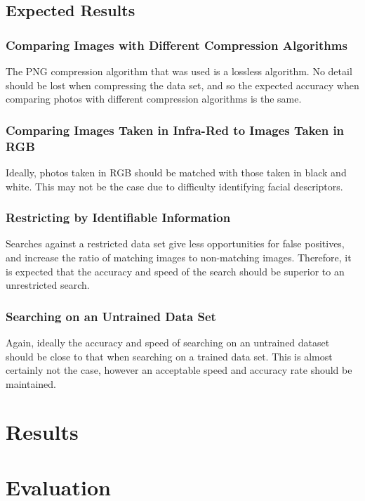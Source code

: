 \documentclass[12pt]{article}
\begin{document}
\subsection{Expected Results}
\subsubsection{Comparing Images with Different Compression Algorithms}
The PNG compression algorithm that was used is a lossless algorithm. No detail should be lost when compressing the data set, and so the expected accuracy when comparing photos with different compression algorithms is the same.

\subsubsection{Comparing Images Taken in Infra-Red to Images Taken in RGB}
Ideally, photos taken in RGB should be matched with those taken in black and white. This may not be the case due to difficulty identifying facial descriptors.

\subsubsection{Restricting by Identifiable Information}
Searches against a restricted data set give less opportunities for false positives, and increase the ratio of matching images to non-matching images. Therefore, it is expected that the accuracy and speed of the search should be superior to an unrestricted search.

\subsubsection{Searching on an Untrained Data Set}
Again, ideally the accuracy and speed of searching on an untrained dataset should be close to that when searching on a trained data set. This is almost certainly not the case, however an acceptable speed and accuracy rate should be maintained.

\newpage
\section{Results}

\newpage
\section{Evaluation}
\end{document}
